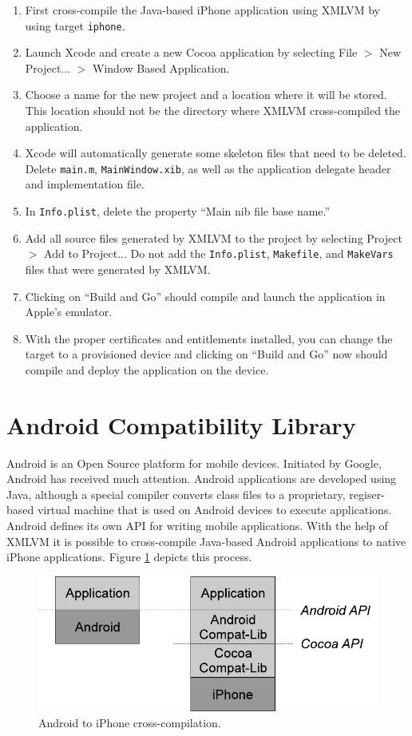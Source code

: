 \documentclass[11pt]{book}
\begin{document}
\begin{enumerate}
\item First cross-compile the Java-based iPhone application using
  XMLVM by using target \texttt{iphone}.
\item Launch Xcode and create a new Cocoa application by selecting
  File $>$ New Project... $>$ Window Based Application.
\item Choose a name for the new project and a location where it will
  be stored. This location should not be the directory where XMLVM
  cross-compiled the application.
\item Xcode will automatically generate some skeleton files that need
  to be deleted. Delete \texttt{main.m}, \texttt{MainWindow.xib}, as
  well as the application delegate header and implementation file.
\item In \texttt{Info.plist}, delete the property ``Main nib file base
  name.''
\item Add all source files generated by XMLVM to the project by
  selecting Project $>$ Add to Project... Do not add the
  \texttt{Info.plist}, \texttt{Makefile}, and \texttt{MakeVars} files
  that were generated by XMLVM.
\item Clicking on ``Build and Go'' should compile and launch the
  application in Apple's emulator.
\item With the proper certificates and entitlements installed, you can
  change the target to a provisioned device and clicking on ``Build
  and Go'' now should compile and deploy the application on the
  device.
\end{enumerate}


\section{Android Compatibility Library}
\label{SEC_ANDROID4IPHONE}

Android is an Open Source platform for mobile devices. Initiated by
Google, Android has received much attention. Android applications are
developed using Java, although a special compiler converts class files
to a proprietary, regiser-based virtual machine that is used on
Android devices to execute applications. Android defines its own API
for writing mobile applications. With the help of XMLVM it is possible
to cross-compile Java-based Android applications to native iPhone
applications. Figure \ref{FIG_ANDROID2IPHONE} depicts this process.

\begin{figure}
\includegraphics{pics/android2iphone.pdf}
\caption{\label{FIG_ANDROID2IPHONE} Android to iPhone cross-compilation.}
\end{figure}
\end{document}

